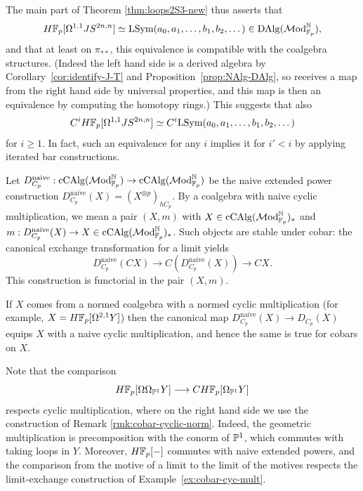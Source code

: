 \documentclass{amsart}
\numberwithin{proposition}{section}
\numberwithin{equation}{section}
\def\LSym{\mathrm{LSym}}
\def\cCAlg{\mathrm{cCAlg}}
\def\DAlg{\mathrm{DAlg}}
\newcommand{\naive}{\mathrm{naive}}
\begin{document}
\begin{remark} \label{rmk:loops2S3-derived-algebra}
The main part of Theorem \ref{thm:loops2S3-new} thus asserts that \[ H\F_p[\Omega^{1,1}JS^{2n,n}] \wequi \LSym(a_0, a_1, \dots, b_1, b_2, \dots) \in \DAlg(\Mod_{\F_p}^\N), \] and that at least on $\pi_{**}$, this equivalence is compatible with the coalgebra structures.
(Indeed the left hand side is a derived algebra by Corollary~\ref{cor:identify-J-T} and Proposition~\ref{prop:NAlg-DAlg}, so receives a map from the right hand side by universal properties, and this map is then an equivalence by computing the homotopy rings.)
This suggests that also \[ C^i H\F_p[\Omega^{1,1}JS^{2n,n}] \wequi C^i \LSym(a_0, a_1, \dots, b_1, b_2, \dots) \] for $i \ge 1$.
In fact, such an equivalence for any $i$ implies it for $i' < i$ by applying iterated bar constructions.
\end{remark}

\begin{remark} \label{rmk:cobar-cyclic-norm}
Let $D_{C_p}^\naive: \cCAlg(\Mod_{\F_p}^\N) \to \cCAlg(\Mod_{\F_p}^\N)$ be the naive extended power construction $D_{C_p}^\naive(X) = (X^{\otimes p})_{hC_p}$.
By a coalgebra with naive cyclic multiplication, we mean a pair $(X, m)$ with $X \in \cCAlg(\Mod_{\F_p}^\N)_*$ and $m: D_{C_p}^\naive(X) \to X \in \cCAlg(\Mod_{\F_p}^\N)_*$.
Such objects are stable under cobar: the canonical exchange transformation for a limit yields \[ D_{C_p}^\naive(CX) \to C(D_{C_p}^\naive(X)) \to CX. \]
This construction is functorial in the pair $(X, m)$.
\end{remark}

\begin{example} \label{ex:cobar-cyc-mult}
If $X$ comes from a normed coalgebra with a normed cyclic multiplication (for example, $X = H\F_p[\Omega^{2,1}Y]$) then the canonical map $D_{C_p}^\naive(X) \to D_{C_p}(X)$ equips $X$ with a naive cyclic multiplication, and hence the same is true for cobars on $X$.
\end{example}

\begin{remark} \label{rmk:cobar-cyclic-commute}
Note that the comparison
\[
H\F_p[\Omega\Omega_{\P^1}Y]\longrightarrow CH\F_p[\Omega_{\P^1}Y]
\]
respects cyclic multiplication, where on the right hand side we use the construction of Remark \ref{rmk:cobar-cyclic-norm}.
Indeed, the geometric multiplication is precomposition with the conorm of $\P^1$, which commutes with taking loops in $Y$.
Moreover, $H\F_p[\ph]$ commutes with naive extended powers, and the comparison from the motive of a limit to the limit of the motives respects the limit-exchange construction of Example~\ref{ex:cobar-cyc-mult}.
\end{remark}
\end{document}
